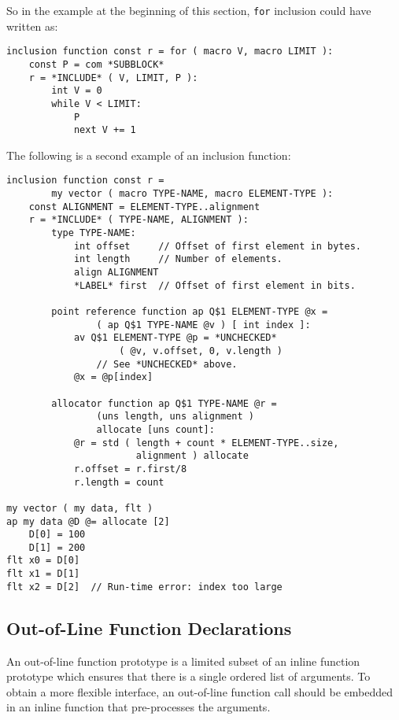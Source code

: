 \documentclass[12pt]{article}
\newenvironment{indpar}[1][0.3in]%
	{\begin{list}{}%
		     {\setlength{\itemsep}{0in}%
		      \setlength{\topsep}{0in}%
		      \setlength{\parsep}{1ex}%
		      \setlength{\labelwidth}{#1}%
		      \setlength{\leftmargin}{#1}%
		      \addtolength{\leftmargin}{\labelsep}}%
	 \item}%
	{\end{list}}
\begin{document}
So in the example at the beginning of this section,
{\tt for} inclusion could have written as:
\begin{indpar}[1em]\begin{verbatim}
inclusion function const r = for ( macro V, macro LIMIT ):
    const P = com *SUBBLOCK*
    r = *INCLUDE* ( V, LIMIT, P ):
        int V = 0
        while V < LIMIT:
            P
            next V += 1
\end{verbatim}\end{indpar}

The following is a second example of an inclusion function:
\begin{indpar}[1em]\begin{verbatim}
inclusion function const r =
        my vector ( macro TYPE-NAME, macro ELEMENT-TYPE ):
    const ALIGNMENT = ELEMENT-TYPE..alignment
    r = *INCLUDE* ( TYPE-NAME, ALIGNMENT ):
        type TYPE-NAME:
            int offset     // Offset of first element in bytes.
            int length     // Number of elements.
            align ALIGNMENT
            *LABEL* first  // Offset of first element in bits.

        point reference function ap Q$1 ELEMENT-TYPE @x =
                ( ap Q$1 TYPE-NAME @v ) [ int index ]:
            av Q$1 ELEMENT-TYPE @p = *UNCHECKED*
                    ( @v, v.offset, 0, v.length )
                // See *UNCHECKED* above.
            @x = @p[index]

        allocator function ap Q$1 TYPE-NAME @r =
                (uns length, uns alignment )
                allocate [uns count]:
            @r = std ( length + count * ELEMENT-TYPE..size,
                       alignment ) allocate
            r.offset = r.first/8
            r.length = count

my vector ( my data, flt )
ap my data @D @= allocate [2]
    D[0] = 100
    D[1] = 200
flt x0 = D[0]
flt x1 = D[1]
flt x2 = D[2]  // Run-time error: index too large
\end{verbatim}\end{indpar}


\subsection{Out-of-Line Function Declarations}
\label{OUT-OF-LINE-FUNCTION-DECLARATIONS}

An out-of-line function prototype is a limited subset of
an inline function prototype which ensures that there is
a single ordered list of arguments.  To obtain a more
flexible interface, an out-of-line function call should
be embedded in an inline function that pre-processes the
arguments.
\end{document}
